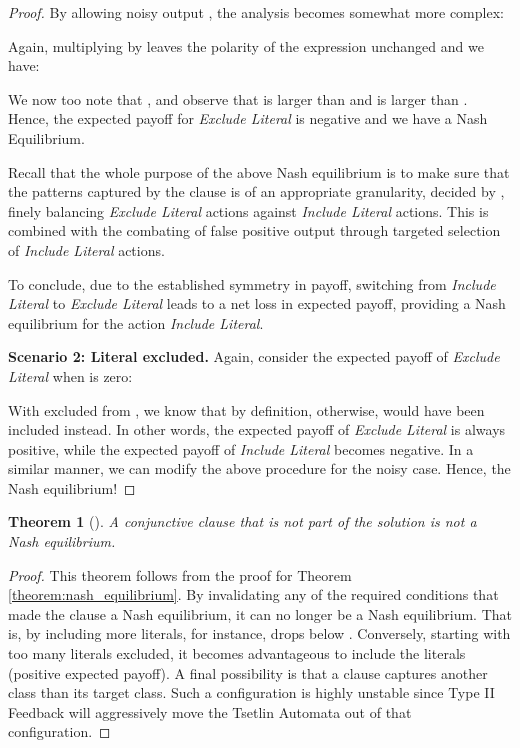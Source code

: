 \documentclass[11pt,a4paper]{article}
\newtheorem{mytheorem}{Theorem}
\begin{document}
\begin{proof}
By allowing noisy output , the analysis becomes somewhat more complex:

Again, multiplying by  leaves the polarity of the expression unchanged and we have:

We now too note that , and
observe that  is larger than  and  is larger than . Hence, the expected payoff for \emph{Exclude Literal} is negative and we have a Nash Equilibrium.

Recall that the whole purpose of the above Nash equilibrium is to make sure that the patterns captured by the clause  is of an appropriate granularity, decided by , finely balancing \emph{Exclude Literal} actions against \emph{Include Literal} actions. This is combined with the combating of false positive output through targeted selection of \emph{Include Literal} actions.

To conclude, due to the established symmetry in payoff, switching from \emph{Include Literal} to \emph{Exclude Literal} leads to a net loss in expected payoff, providing a Nash equilibrium for the action \emph{Include Literal}.

{\bf Scenario 2: Literal excluded.} Again, consider the expected payoff of \emph{Exclude Literal} when  is zero:

With  excluded from , we know that  by definition, otherwise,  would have been included instead. In other words, the expected payoff of \emph{Exclude Literal} is always positive, while the expected payoff of \emph{Include Literal} becomes negative. In a similar manner, we can modify the above procedure for the noisy case. Hence, the Nash equilibrium!
\end{proof}

\begin{mytheorem}[]A conjunctive clause  that is not part of the solution  is not a Nash equilibrium.\label{nash_equilibrium}
\end{mytheorem}
\begin{proof}
This theorem follows from the proof for Theorem \ref{theorem:nash_equilibrium}. By invalidating any of the required conditions that made the clause  a Nash equilibrium, it can no longer be a Nash equilibrium. That is, by including more literals, for instance,  drops below . Conversely, starting with too many literals excluded,  it becomes advantageous to include the literals (positive expected payoff). A final possibility is that a clause captures another class than its target class. Such a configuration is highly unstable since Type II Feedback will aggressively move the Tsetlin Automata out of that configuration.
\end{proof}
\end{document}
